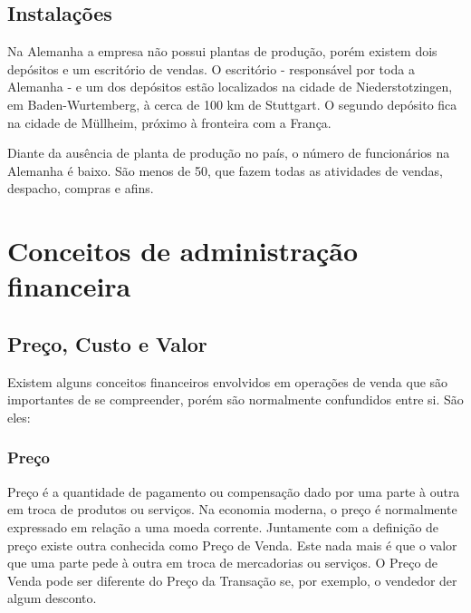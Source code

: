 \documentclass[12pt]{article}
\begin{document}


\subsection{Instalações}
	
	Na Alemanha a empresa não possui plantas de produção, porém existem dois depósitos e um escritório de vendas. O escritório - responsável por toda a Alemanha - e um dos depósitos estão localizados na cidade de Niederstotzingen, em Baden-Wurtemberg, à cerca de 100 km de Stuttgart. O segundo depósito fica na cidade de Müllheim, próximo à fronteira com a França.

	Diante da ausência de planta de produção no país, o número de funcionários na Alemanha é baixo. São menos de 50, que fazem todas as atividades de vendas, despacho, compras e afins.

\section{Conceitos de administração financeira}

\subsection{Preço, Custo e Valor}
	
	Existem alguns conceitos financeiros envolvidos em operações de venda que são importantes de se compreender, porém são normalmente confundidos entre si. São eles:

\subsubsection{Preço}

	Preço é a quantidade de pagamento ou compensação dado por uma parte à outra em troca de produtos ou serviços. Na economia moderna, o preço é normalmente expressado em relação a uma moeda corrente. Juntamente com a definição de preço existe outra conhecida como Preço de Venda. Este nada mais é que o valor que uma parte pede à outra em troca de mercadorias ou serviços. O Preço de Venda pode ser diferente do Preço da Transação se, por exemplo, o vendedor der algum desconto.
\end{document}
